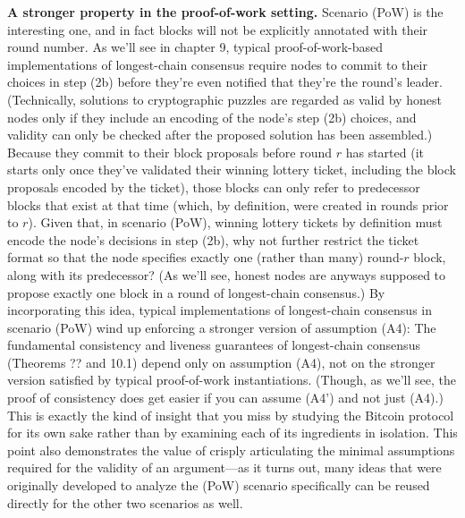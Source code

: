\noindent
\textbf{A stronger property in the proof-of-work setting.} Scenario (PoW) is the interesting
one, and in fact blocks will not be explicitly annotated with their round number. As we’ll see
in chapter 9, typical proof-of-work-based implementations of longest-chain consensus require
nodes to commit to their choices in step (2b) before they’re even notified that they’re the
round’s leader. (Technically, solutions to cryptographic puzzles are regarded as valid by
honest nodes only if they include an encoding of the node’s step (2b) choices, and validity
can only be checked after the proposed solution has been assembled.) Because they commit
to their block proposals before round $r$ has started (it starts only once they've validated their
winning lottery ticket, including the block proposals encoded by the ticket), those blocks can
only refer to predecessor blocks that exist at that time (which, by definition, were created
in rounds prior to $r$).
Given that, in scenario (PoW), winning lottery tickets by definition must encode the
node’s decisions in step (2b), why not further restrict the ticket format so that the node specifies exactly one (rather than many) round-$r$ block, along with its predecessor? (As we’ll see,
honest nodes are anyways supposed to propose exactly one block in a round of longest-chain
consensus.) By incorporating this idea, typical implementations of longest-chain consensus
in scenario (PoW) wind up enforcing a stronger version of assumption (A4):
The fundamental consistency and liveness guarantees of longest-chain consensus (Theorems ?? and 10.1) depend only on assumption (A4), not on the stronger version satisfied by
typical proof-of-work instantiations. (Though, as we’ll see, the proof of consistency does get
easier if you can assume (A4’) and not just (A4).) This is exactly the kind of insight that
you miss by studying the Bitcoin protocol for its own sake rather than by examining each
of its ingredients in isolation. This point also demonstrates the value of crisply articulating
the minimal assumptions required for the validity of an argument—as it turns out, many
ideas that were originally developed to analyze the (PoW) scenario specifically can be reused
directly for the other two scenarios as well.

